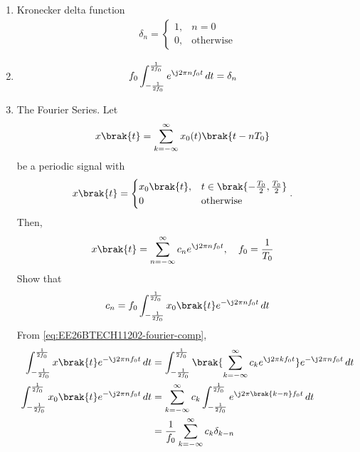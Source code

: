 \begin{enumerate}[label=\thesubsection.\arabic*, ref=\thesubsection.\theenumi]
\item Kronecker delta function
\begin{align}
\label{eq:EE26BTECH11202-kronecker}
\delta_{n}= 
\begin{cases} 
1, & n = 0 \\ 
0, & \text{otherwise}
\end{cases}
\end{align}
\item 
\begin{align}
f_0\int_{-\frac{1}{2f_0}}^{\frac{1}{2f_0}} e^{\j 2\pi n f_0 t} \, dt &= 
\delta_{n}
\label{eq:EE26BTECH11202-kronecker-exp-int}
\end{align}
\item The Fourier Series. Let
\begin{align}
\label{eq:EE26BTECH11202-fourier-periodic}
	x\brak{t} &= \sum_{k=-\infty}^{\infty} x_0(t)\brak{t-nT_0} 
\end{align}
be a periodic signal
with 
\begin{align}
\label{eq:EE26BTECH11202-fourier-fund}
	x\brak{t} &=  \begin{cases}
		x_0\brak{t}, & t \in \brak{-\frac{T_0}{2},\frac{T_0}{2}}
		\\
		0 & \text{otherwise}
\end{cases}
.
\end{align}
  Then, 
\begin{align}
\label{eq:EE26BTECH11202-fourier-comp}
	x\brak{t} &= \sum_{n=-\infty}^{\infty} c_n e^{\j 2\pi n f_0 t} , \quad f_0 = \frac{1}{T_0}
\end{align}
Show that 
\begin{align}
c_n = f_0 \int_{-\frac{1}{2f_0}}^{\frac{1}{2f_0}} x_0\brak{t} e^{-\j 2\pi n f_0 t} \, dt 
\label{eq:EE26BTECH11202-Fourier_1}
\end{align}
\solution
From \eqref{eq:EE26BTECH11202-fourier-comp},
\begin{align}
\int_{-\frac{1}{2f_0}}^{\frac{1}{2f_0}} x\brak{t} e^{-\j 2\pi n f_0 t} \, dt
&= \int_{-\frac{1}{2f_0}}^{\frac{1}{2f_0}} \brak{\sum_{k=-\infty}^{\infty} c_k e^{\j 2\pi k f_0 t}} e^{-\j 2\pi n f_0 t} \, dt 
\\
\int_{-\frac{1}{2f_0}}^{\frac{1}{2f_0}} x_0\brak{t} e^{-\j 2\pi n f_0 t} \, dt&=\sum_{k=-\infty}^{\infty} c_k \int_{-\frac{1}{2f_0}}^{\frac{1}{2f_0}} e^{\j 2\pi \brak{k - n} f_0 t} \, dt
\\
									      &									      = \frac{1}{f_0}\sum_{k=-\infty}^{\infty} c_k  \delta_{k - n} 
\end{align}

\end{enumerate}
